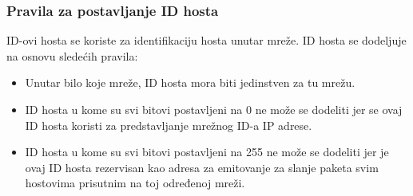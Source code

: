 \subsubsection{Pravila za postavljanje ID hosta}
ID-ovi hosta se koriste za identifikaciju hosta unutar mreže. ID hosta se dodeljuje na osnovu slede\'{c}ih pravila:\\
\begin{itemize}
    \item Unutar bilo koje mreže, ID hosta mora biti jedinstven za tu mrežu.
    \item ID hosta u kome su svi bitovi postavljeni na 0 ne može se dodeliti jer se ovaj ID hosta koristi za predstavljanje mrežnog ID-a IP adrese.
    \item ID hosta u kome su svi bitovi postavljeni na 255 ne može se dodeliti jer je ovaj ID hosta rezervisan kao adresa za emitovanje za slanje paketa svim hostovima prisutnim na toj određenoj mreži.
\end{itemize}

